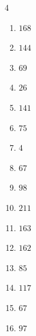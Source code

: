 \begin{multicols}{4}
\begin{enumerate}
  \item $168$


  \item $144$


  \item $69$


  \item $26$


  \item $141$


  \item $75$


  \item $4$


  \item $67$


\columnbreak %

  \item $98$


  \item $211$


  \item $163$


  \item $162$


  \item $85$


  \item $117$


  \item $67$


  \item $97$


\end{enumerate}
\end{multicols}
